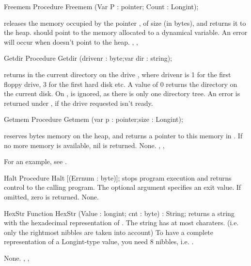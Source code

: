 \documentclass{report}
\begin{document}

\begin{procedure}{Freemem}
\Declaration
Procedure Freemem (Var P : pointer; Count : Longint);

\Description
{} releases the memory occupied by the pointer , of size
 (in bytes), and returns it to the heap.  should point to the memory
allocated to a dynamical variable.
\Errors
An error will occur when  doesn't point to the heap.
\SeeAlso
{}, , 
\end{procedure}


\begin{procedure}{Getdir}
\Declaration
Procedure Getdir (drivenr : byte;var dir : string);

\Description
{} returns in  the current directory on the drive
, where {drivenr} is 1 for the first floppy drive, 3 for the
first hard disk etc. A value of 0 returns the directory on the current disk.
On \linux,  is ignored, as there is only one directory tree.
\Errors
An error is returned under \dos, if the drive requested isn't ready.
\SeeAlso
{}
\end{procedure}


\begin{procedure}{Getmem}
\Declaration
Procedure Getmem (var p : pointer;size : Longint);

\Description
{} reserves  bytes memory on the heap, and returns a
pointer to this memory in . If no more memory is available, nil is
returned.
\Errors
None.
\SeeAlso
{}, , 
\end{procedure}
For an example, see .
\begin{procedure}{Halt}
\Declaration
Procedure Halt [(Errnum : byte)];
\Description
{} stops program execution and returns control to the calling
program. The optional argument  specifies an exit value. If
omitted, zero is returned.
\Errors
None.
\SeeAlso
{}
\end{procedure}


\begin{function}{HexStr}
\Declaration
Function HexStr (Value : longint; cnt : byte) : String;
\Description
{} returns a string with the hexadecimal representation
of . The string has at most  charaters.
 (i.e. only the  rightmost nibbles are taken into account)
To have a complete representation of a Longint-type value, you need 8
nibbles, i.e. .

\Errors
None.
\SeeAlso
{}, , 
\end{function}
\end{document}
